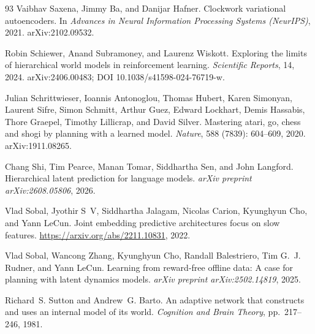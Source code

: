 \begin{thebibliography}{93}
Vaibhav Saxena, Jimmy Ba, and Danijar Hafner.
\newblock Clockwork variational autoencoders.
\newblock In \emph{Advances in Neural Information Processing Systems
  (NeurIPS)}, 2021.
\newblock arXiv:2102.09532.

Robin Schiewer, Anand Subramoney, and Laurenz Wiskott.
\newblock Exploring the limits of hierarchical world models in reinforcement
  learning.
\newblock \emph{Scientific Reports}, 14, 2024.
\newblock arXiv:2406.00483; DOI 10.1038/s41598-024-76719-w.

Julian Schrittwieser, Ioannis Antonoglou, Thomas Hubert, Karen Simonyan,
  Laurent Sifre, Simon Schmitt, Arthur Guez, Edward Lockhart, Demis Hassabis,
  Thore Graepel, Timothy Lillicrap, and David Silver.
\newblock Mastering atari, go, chess and shogi by planning with a learned
  model.
\newblock \emph{Nature}, 588 (7839): 604--609, 2020.
\newblock arXiv:1911.08265.

Chang Shi, Tim Pearce, Manan Tomar, Siddhartha Sen, and John Langford.
\newblock Hierarchical latent prediction for language models.
\newblock \emph{arXiv preprint arXiv:2608.05806}, 2026.

Vlad Sobal, Jyothir S~V, Siddhartha Jalagam, Nicolas Carion, Kyunghyun Cho, and
  Yann LeCun.
\newblock Joint embedding predictive architectures focus on slow features.
\newblock \url{https://arxiv.org/abs/2211.10831}, 2022.

Vlad Sobal, Wancong Zhang, Kyunghyun Cho, Randall Balestriero, Tim G.~J.
  Rudner, and Yann LeCun.
\newblock Learning from reward-free offline data: A case for planning with
  latent dynamics models.
\newblock \emph{arXiv preprint arXiv:2502.14819}, 2025.

Richard~S. Sutton and Andrew~G. Barto.
\newblock An adaptive network that constructs and uses an internal model of its
  world.
\newblock \emph{Cognition and Brain Theory}, pp.\  217--246, 1981.


\end{thebibliography}
